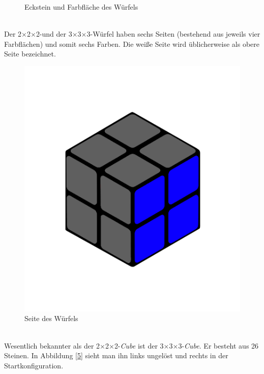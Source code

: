 \documentclass[12pt,a4paper, usenames, dvipsnames]{article}
\theoremstyle{mystyle}
\theoremstyle{definition}
\newcommand{\Ttwo}{2$\times$2$\times$2-}
\newcommand{\Tthree}{3$\times$3$\times$3-}
\begin{document}
\begin{description}
\begin{figure}[h]
\caption[Eckstein und Farbfläche des Würfels]{Eckstein und Farbfläche des Würfels}
\label{4}
\end{figure} 


\newpage

\item[Seite] \ \\
Der \Ttwo und der \Tthree Würfel haben sechs Seiten (bestehend aus jeweils vier Farbflächen) und somit sechs Farben. Die weiße Seite wird üblicherweise als obere Seite bezeichnet. \\
\begin{figure}[h]
\centering
\includegraphics[scale=0.1]{2x2seite.png}
\caption[Seite des Würfels]{Seite des Würfels}
\end{figure}


\item[\Tthree Würfel] \ \\
Wesentlich bekannter als der \Ttwo \textit{Cube} ist der \Tthree \textit{Cube}. Er besteht aus 26 Steinen. In Abbildung \ref{5} sieht man ihn links ungelöst und rechts in der Startkonfiguration.


\end{description}
\end{document}
